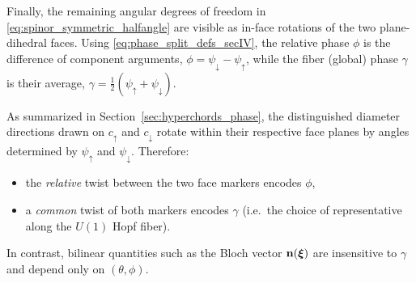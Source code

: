 Finally, the remaining angular degrees of freedom in \eqref{eq:spinor_symmetric_halfangle} are visible as in-face rotations of the two plane-dihedral faces.
Using \eqref{eq:phase_split_defs_secIV}, the relative phase $\phi$ is the difference of component arguments,
$\phi=\psi_\downarrow-\psi_\uparrow$, while the fiber (global) phase $\gamma$ is their average,
$\gamma=\tfrac12(\psi_\uparrow+\psi_\downarrow)$.

As summarized in Section~\ref{sec:hyperchords_phase}, the distinguished diameter directions drawn on $c_\uparrow$ and $c_\downarrow$ rotate within their respective face planes by angles determined by $\psi_\uparrow$ and $\psi_\downarrow$.
Therefore:
\begin{itemize}
\item the \emph{relative} twist between the two face markers encodes $\phi$,
\item a \emph{common} twist of both markers encodes $\gamma$ (i.e.\ the choice of representative along the $U(1)$ Hopf fiber).
\end{itemize}
In contrast, bilinear quantities such as the Bloch vector $\mathbf{n}(\bm{\xi})$ are insensitive to $\gamma$ and depend only on $(\theta,\phi)$.
